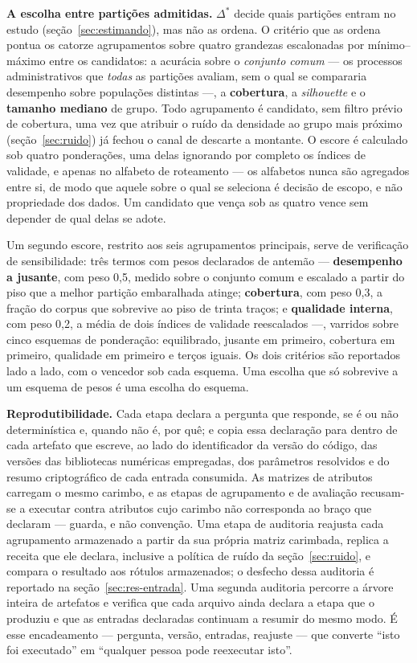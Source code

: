 \textbf{A escolha entre partições admitidas.} $\Delta^{*}$ decide quais partições entram no estudo
(seção~\ref{sec:estimando}), mas não as ordena. O critério que as ordena pontua os catorze
agrupamentos sobre quatro grandezas escalonadas por mínimo--máximo entre os candidatos: a acurácia
sobre o \emph{conjunto comum} --- os processos administrativos que \emph{todas} as partições
avaliam, sem o qual se compararia desempenho sobre populações distintas ---, a \textbf{cobertura},
a \emph{silhouette} e o \textbf{tamanho mediano} de grupo. Todo agrupamento é candidato, sem filtro
prévio de cobertura, uma vez que atribuir o ruído da densidade ao grupo mais próximo
(seção~\ref{sec:ruido}) já fechou o canal de descarte a montante. O escore é calculado sob quatro
ponderações, uma delas ignorando por completo os índices de validade, e apenas no alfabeto de
roteamento --- os alfabetos nunca são agregados entre si, de modo que aquele sobre o qual se
seleciona é decisão de escopo, e não propriedade dos dados. Um candidato que vença sob as quatro
vence sem depender de qual delas se adote.

Um segundo escore, restrito aos seis agrupamentos principais, serve de verificação de sensibilidade:
três termos com pesos declarados de antemão --- \textbf{desempenho a jusante}, com peso 0,5, medido
sobre o conjunto comum e escalado a partir do piso que a melhor partição embaralhada atinge;
\textbf{cobertura}, com peso 0,3, a fração do corpus que sobrevive ao piso de trinta traços; e
\textbf{qualidade interna}, com peso 0,2, a média de dois índices de validade reescalados ---,
varridos sobre cinco esquemas de ponderação: equilibrado, jusante em primeiro, cobertura em
primeiro, qualidade em primeiro e terços iguais. Os dois critérios são reportados lado a lado, com o
vencedor sob cada esquema. Uma escolha que só sobrevive a um esquema de pesos é uma escolha do
esquema.

\textbf{Reprodutibilidade.} Cada etapa declara a pergunta que responde, se é ou não determinística
e, quando não é, por quê; e copia essa declaração para dentro de cada artefato que escreve, ao lado
do identificador da versão do código, das versões das bibliotecas numéricas empregadas, dos
parâmetros resolvidos e do resumo criptográfico de cada entrada consumida. As matrizes de atributos
carregam o mesmo carimbo, e as etapas de agrupamento e de avaliação recusam-se a executar contra
atributos cujo carimbo não corresponda ao braço que declaram --- guarda, e não convenção. Uma etapa
de auditoria reajusta cada agrupamento armazenado a partir da sua própria matriz carimbada, replica
a receita que ele declara, inclusive a política de ruído da seção~\ref{sec:ruido}, e compara o
resultado aos rótulos armazenados; o desfecho dessa auditoria é reportado na
seção~\ref{sec:res-entrada}. Uma segunda auditoria percorre a árvore inteira de artefatos e verifica
que cada arquivo ainda declara a etapa que o produziu e que as entradas declaradas continuam a
resumir do mesmo modo. É esse encadeamento --- pergunta, versão, entradas, reajuste --- que
converte ``isto foi executado'' em ``qualquer pessoa pode reexecutar isto''.

